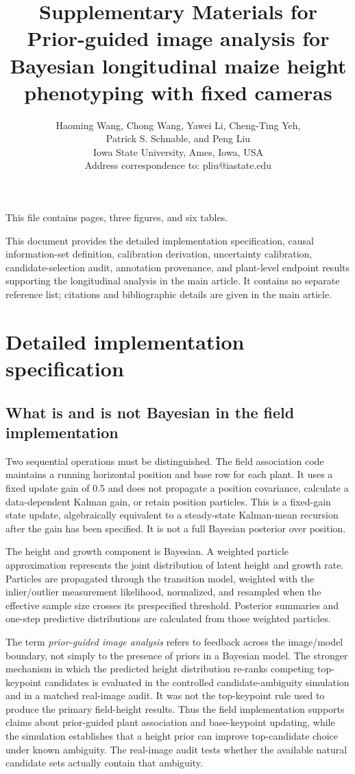 \documentclass[12pt,letterpaper]{article}
\title{Supplementary Materials for\\
Prior-guided image analysis for Bayesian longitudinal maize height phenotyping with fixed cameras}
\author{Haoming Wang, Chong Wang, Yawei Li, Cheng-Ting Yeh,\\
Patrick S. Schnable, and Peng Liu\\[0.6em]
\small Iowa State University, Ames, Iowa, USA\\
\small Address correspondence to: pliu@iastate.edu}
\date{}
\begin{document}
\maketitle

\begin{center}
\small This file contains \pageref{LastPage} pages, three figures, and six tables.
\end{center}

\noindent This document provides the detailed implementation specification, causal information-set definition, calibration derivation, uncertainty calibration, candidate-selection audit, annotation provenance, and plant-level endpoint results supporting the longitudinal analysis in the main article. It contains no separate reference list; citations and bibliographic details are given in the main article.

\section{Detailed implementation specification}
\label{sec:s-specification}

\subsection{What is and is not Bayesian in the field implementation}

Two sequential operations must be distinguished. The field association code maintains a running horizontal position and base row for each plant. It uses a fixed update gain of 0.5 and does not propagate a position covariance, calculate a data-dependent Kalman gain, or retain position particles. This is a fixed-gain state update, algebraically equivalent to a steady-state Kalman-mean recursion after the gain has been specified. It is not a full Bayesian posterior over position.

The height and growth component is Bayesian. A weighted particle approximation represents the joint distribution of latent height and growth rate. Particles are propagated through the transition model, weighted with the inlier/outlier measurement likelihood, normalized, and resampled when the effective sample size crosses its prespecified threshold. Posterior summaries and one-step predictive distributions are calculated from those weighted particles.

The term \emph{prior-guided image analysis} refers to feedback across the image/model boundary, not simply to the presence of priors in a Bayesian model. The stronger mechanism in which the predicted height distribution re-ranks competing top-keypoint candidates is evaluated in the controlled candidate-ambiguity simulation and in a matched real-image audit. It was not the top-keypoint rule used to produce the primary field-height results. Thus the field implementation supports claims about prior-guided plant association and base-keypoint updating, while the simulation establishes that a height prior can improve top-candidate choice under known ambiguity. The real-image audit tests whether the available natural candidate sets actually contain that ambiguity.
\end{document}
